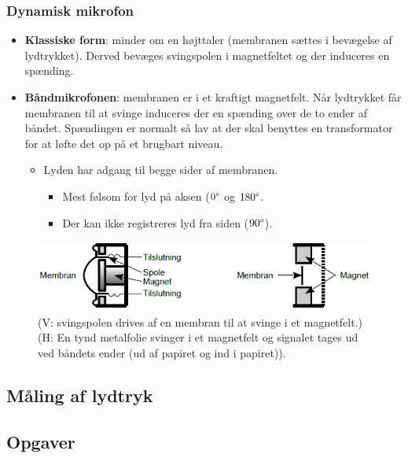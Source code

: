 \subsubsection{Dynamisk mikrofon}
\begin{itemize}
	\item \textbf{Klassiske form}: minder om en højttaler (membranen sættes i bevægelse af lydtrykket). Derved bevæges svingspolen i magnetfeltet
	og der induceres en spænding.
	\item \textbf{Båndmikrofonen}: membranen er i et kraftigt magnetfelt. Når lydtrykket får membranen til at svinge induceres der en spænding over de to ender af båndet. Spændingen er normalt så lav at der skal benyttes en transformator for at løfte det op på et brugbart niveau. 
	\begin{itemize}
		\item Lyden har adgang til begge sider af membranen.
		\begin{itemize}
			\item Mest følsom for lyd på aksen ($0\degree$ og $180\degree$.
			\item Der kan ikke registreres lyd fra siden ($90\degree$).
		\end{itemize}
	\end{itemize} 
\end{itemize}
\begin{figure} [H]
	\centering
	\includegraphics[width=.9\linewidth]{graphics/12.png}
	\caption{(V: svingspolen drives af en membran til at svinge i et magnetfelt.) (H: En tynd metalfolie svinger i et magnetfelt og signalet tages ud ved båndets ender (ud af papiret og ind i papiret)).}
	\label{fig:12}
\end{figure}

\subsection{Måling af lydtryk}

\subsection{Opgaver}

